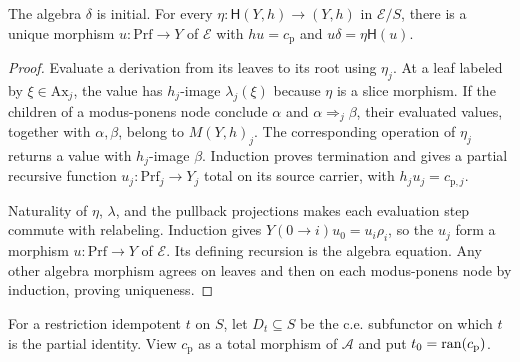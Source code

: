 \begin{proposition}\label{prop:fork-proof-initial}
The algebra $\delta$ is initial. For every
$\eta:\mathsf H(Y,h)\to(Y,h)$ in $\mathcal E/S$, there is a
unique morphism $u:\mathrm{Prf}\to Y$ of $\mathcal E$ with
$hu=c_{\mathrm p}$ and $u\delta=\eta\mathsf H(u)$.
\end{proposition}
\begin{proof}
Evaluate a derivation from its leaves to its root using $\eta_j$.
At a leaf labeled by $\xi\in\mathrm{Ax}_j$, the value has
$h_j$-image $\lambda_j(\xi)$ because $\eta$ is a slice morphism.
If the children of a modus-ponens node conclude $\alpha$ and
$\alpha\Rightarrow_j\beta$, their evaluated values, together
with $\alpha,\beta$, belong to $M(Y,h)_j$. The corresponding
operation of $\eta_j$ returns a value with $h_j$-image $\beta$.
Induction proves termination and gives a partial recursive function
$u_j:\mathrm{Prf}_j\to Y_j$ total on its source carrier, with
$h_ju_j=c_{\mathrm p,j}$.

Naturality of $\eta$, $\lambda$, and the pullback projections
makes each evaluation step commute with relabeling. Induction gives
$Y(0\to i)u_0=u_i\rho_i$, so the $u_j$ form a morphism
$u:\mathrm{Prf}\to Y$ of $\mathcal E$. Its defining recursion
is the algebra equation. Any other algebra morphism agrees on
leaves and then on each modus-ponens node by induction, proving
uniqueness.
\end{proof}

For a restriction idempotent $t$ on $S$, let $D_t\subseteq S$
be the c.e. subfunctor on which $t$ is the partial identity. View
$c_{\mathrm p}$ as a total morphism of $\mathcal A$ and put $t_0=\operatorname{ran}(c_{\mathrm p})$.

